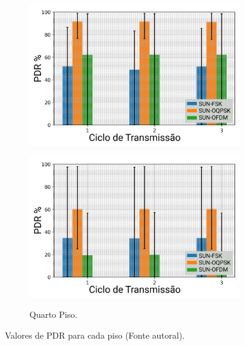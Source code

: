 \begin{figure}[H]
\begin{subfigure}{.4\textwidth}
            \includegraphics[width=\textwidth]{./sections/textual/chapters/images/mod_3_floor.png}
            \label{fig:piso3}
      \end{subfigure}
      \begin{subfigure}{.4\textwidth}
            \centering
            \caption{Quarto Piso.}
            \includegraphics[width=\textwidth]{./sections/textual/chapters/images/mod_4_floor.png}
            \label{fig:piso4}
      \end{subfigure}
      \caption{Valores de PDR para cada piso (Fonte autoral).}
      \label{fig:pdr_andar}
\end{figure}




